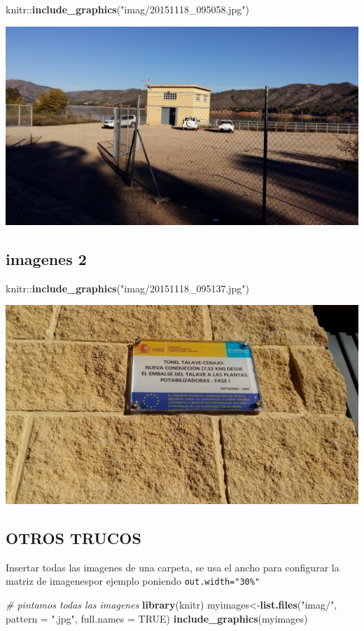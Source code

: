 \documentclass[10pt,spanish,a4paper,oneside]{article}
\newenvironment{Shaded}{\begin{snugshade}}{\end{snugshade}}
\newcommand{\KeywordTok}[1]{\textcolor[rgb]{0.27,0.27,0.27}{\textbf{{#1}}}}
\newcommand{\DataTypeTok}[1]{\textcolor[rgb]{0.27,0.27,0.27}{{#1}}}
\newcommand{\StringTok}[1]{\textcolor[rgb]{0.5,0.5,0.5}{{#1}}}
\newcommand{\CommentTok}[1]{\textcolor[rgb]{0.37,0.37,0.37}{\textit{{#1}}}}
\newcommand{\OtherTok}[1]{\textcolor[rgb]{0.37,0.37,0.37}{{#1}}}
\newcommand{\NormalTok}[1]{{#1}}
\begin{document}
\begin{Shaded}
\begin{Highlighting}[]
\NormalTok{knitr::}\KeywordTok{include_graphics}\NormalTok{(}\StringTok{"imag/20151118_095058.jpg"}\NormalTok{)}
\end{Highlighting}
\end{Shaded}

\includegraphics[width=0.3\linewidth]{imag/20151118_095058}

\subsection{imagenes 2}\label{imagenes-2}

\begin{Shaded}
\begin{Highlighting}[]
\NormalTok{knitr::}\KeywordTok{include_graphics}\NormalTok{(}\StringTok{"imag/20151118_095137.jpg"}\NormalTok{)}
\end{Highlighting}
\end{Shaded}

\includegraphics[width=0.5\linewidth]{imag/20151118_095137}

\subsection{OTROS TRUCOS}\label{otros-trucos}

Insertar todas las imagenes de una carpeta, se usa el ancho para
configurar la matriz de imagenespor ejemplo poniendo
\texttt{out.width="30\%"}

\begin{Shaded}
\begin{Highlighting}[]
\CommentTok{# pintamos todas las imagenes}
\KeywordTok{library}\NormalTok{(knitr)}
\NormalTok{myimages<-}\KeywordTok{list.files}\NormalTok{(}\StringTok{"imag/"}\NormalTok{, }\DataTypeTok{pattern =} \StringTok{".jpg"}\NormalTok{, }\DataTypeTok{full.names =} \OtherTok{TRUE}\NormalTok{)}
\KeywordTok{include_graphics}\NormalTok{(myimages)}
\end{Highlighting}
\end{Shaded}
\end{document}
